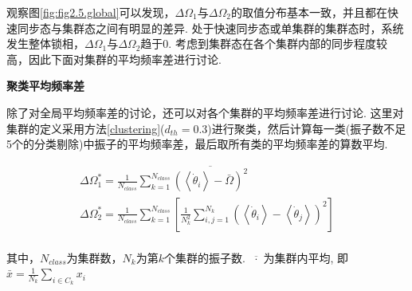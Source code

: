 \documentclass{article}
\begin{document}
观察图\ref{fig:fig2.5.global}可以发现，$\Delta \Omega _1$与$\Delta \Omega _2$的取值分布基本一致，并且都在快速同步态与集群态之间有明显的差异. 处于快速同步态或单集群的集群态时，系统发生整体锁相，$\Delta\Omega_1$与$\Delta\Omega_2$趋于0. 考虑到集群态在各个集群内部的同步程度较高，因此下面对集群的平均频率差进行讨论.

\newpage
\noindent\textbf{聚类平均频率差}

除了对全局平均频率差的讨论，还可以对各个集群的平均频率差进行讨论. 这里对集群的定义采用方法\ref{clustering}($d_{th}=0.3$)进行聚类，然后计算每一类(振子数不足5个的分类剔除)中振子的平均频率差，最后取所有类的平均频率差的算数平均.

$$
\begin{array}{l}
	\Delta \Omega _{1}^{*}=\frac{1}{N_{class}}\sum_{k=1}^{N_{class}}{\overline{\left( \left< \dot{\theta}_i \right> -\bar{\Omega} \right) ^2}}\\
	\Delta \Omega _{2}^{*}=\frac{1}{N_{class}}\sum_{k=1}^{N_{class}}{\left[ \frac{1}{N_{k}^{2}}\sum_{i,j=1}^{N_k}{\left( \left< \dot{\theta}_i \right> -\left< \dot{\theta}_j \right> \right) ^2} \right]}\\
\end{array}
$$

其中，$N_{class}$为集群数，$N_k$为第$k$个集群的振子数. $\overline{\,\,\cdot \,\,}$为集群内平均, 即$\bar{x}=\frac{1}{N_k}\sum_{i\in C_k}{x_i}$
\end{document}
